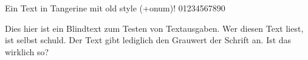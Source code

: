 \documentclass{article}
\begin{document}
\Huge

Ein Text in Tangerine mit old style (+onum)! 01234567890

Dies hier ist ein Blindtext zum Testen von Textausgaben.
Wer diesen Text liest, ist selbst schuld. Der Text gibt lediglich
den Grauwert der Schrift an. Ist das wirklich so?
\end{document}
